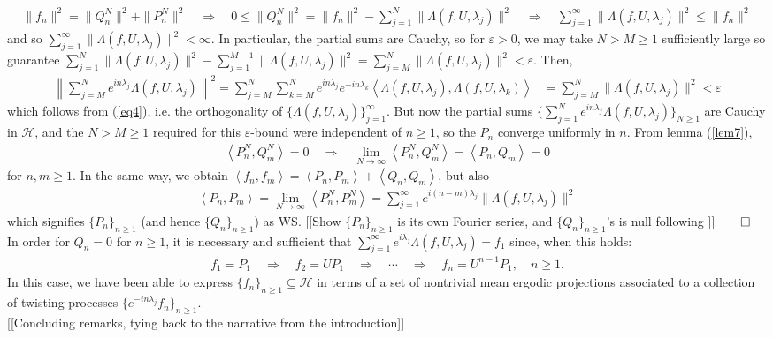 \documentclass[11pt]{report}
\newcommand{\mc}[1]{\mathcal{#1}}
\newcommand{\ip}[2]{\left\langle#1,#2\right\rangle }
\theoremstyle{definition}
\begin{document}
    \begin{align}
        \|f_n\|^2=\|Q^N_n\|^2+\|P^N_n\|^2\quad\Rightarrow\quad 0\leq \|Q^N_n\|^2=\|f_n\|^2-\sum_{j=1}^N\|\Lambda(f,U,\lambda_j)\|^2\quad\Rightarrow\quad \sum_{j=1}^\infty\|\Lambda(f,U,\lambda_j)\|^2\leq \|f_n\|^2\label{eq5}
    \end{align}
    and so $\sum_{j=1}^\infty\|\Lambda(f,U,\lambda_j)\|^2<\infty$. In particular, the partial sums are Cauchy, so for $\varepsilon>0$, we may take $N>M\geq 1$ sufficiently large so guarantee $\sum_{j=1}^N\|\Lambda(f,U,\lambda_j)\|^2-\sum_{j=1}^{M-1}\|\Lambda(f,U,\lambda_j)\|^2=\sum_{j=M}^N\|\Lambda(f,U,\lambda_j)\|^2<\varepsilon$. Then,
    \begin{align*}
        \left\|\sum_{j=M}^Ne^{in\lambda_j}\Lambda(f,U,\lambda_j)\right\|^2=\sum_{j=M}^N\sum_{k=M}^Ne^{in\lambda_j}e^{-in\lambda_k}\ip{\Lambda(f,U,\lambda_j)}{\Lambda(f,U,\lambda_k)}&=\sum_{j=M}^N\|\Lambda(f,U,\lambda_j)\|^2<\varepsilon
    \end{align*}
    which follows from (\ref{eq4}), i.e. the orthogonality of $\{\Lambda(f,U,\lambda_j)\}_{j=1}^\infty$. But now the partial sums $\{\sum_{j=1}^Ne^{in\lambda_j}\Lambda(f,U,\lambda_j)\}_{N\geq 1}$ are Cauchy in $\mc{H}$, and the $N>M\geq 1$ required
    for this $\varepsilon$-bound were independent of $n\geq 1$, so the $P_n$ converge uniformly in $n$. From lemma (\ref{lem7}),
    \begin{align*}
        \ip{P^N_n}{Q^N_m}=0\quad\Rightarrow\quad\lim_{N\rightarrow\infty}\ip{P^N_n}{Q^N_m}=\ip{P_n}{Q_m}=0
    \end{align*} 
    for $n,m\geq 1$. In the same way, we obtain $\ip{f_n}{f_m}=\ip{P_n}{P_m}+\ip{Q_n}{Q_m}$, but also
    \begin{align*}
        \ip{P_n}{P_m}=\lim_{N\rightarrow\infty}\ip{P^N_n}{P^N_m}=\sum_{j=1}^\infty e^{i(n-m)\lambda_j}\|\Lambda(f,U,\lambda_j)\|^2
    \end{align*}
    which signifies $\{P_n\}_{n\geq 1}$ (and hence $\{Q_n\}_{n\geq 1}$) as WS. [[Show $\{P_n\}_{n\geq 1}$ is its own Fourier series, and $\{Q_n\}_{n\geq 1}$'s is null following \cite[theorem 10]{Fan_1946}]]\hfill{$\qed$}\\[5pt]
    \indent In order for $Q_n=0$ for $n\geq 1$, it is necessary and sufficient that $\sum_{j=1}^\infty e^{i\lambda_j}\Lambda(f,U,\lambda_j)=f_1$ since, when this holds:
    \begin{align*}
        f_1=P_1\quad\Rightarrow\quad f_2=UP_1\quad\Rightarrow\quad\cdots\quad\Rightarrow\quad f_n=U^{n-1}P_1,\quad n\geq 1.
    \end{align*}
    In this case, we have been able to express $\{f_n\}_{n\geq 1}\subseteq\mc{H}$ in terms of a set of nontrivial mean ergodic projections associated to a collection of twisting processes $\{e^{-in\lambda_j}f_n\}_{n\geq 1}$.\\[5pt] 
    [[Concluding remarks, tying back to the narrative from the introduction]]
    \newpage
    
    
\end{document}
